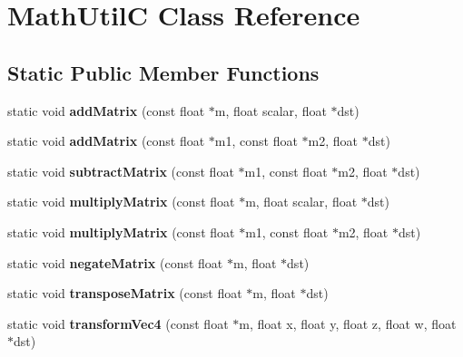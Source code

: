 \hypertarget{classMathUtilC}{}\section{Math\+UtilC Class Reference}
\label{classMathUtilC}
\subsection*{Static Public Member Functions}
\begin{DoxyCompactItemize}
\item 
\mbox{\label{classMathUtilC_a0856156051666babbf2f7dd8cde0551f}} 
static void {\bfseries add\+Matrix} (const float $\ast$m, float scalar, float $\ast$dst)
\item 
\mbox{\label{classMathUtilC_a95674d77169fb3a2ce462707acbefe60}} 
static void {\bfseries add\+Matrix} (const float $\ast$m1, const float $\ast$m2, float $\ast$dst)
\item 
\mbox{\label{classMathUtilC_a8c0aaaef6e85a7f9b46f22c6ac3098f6}} 
static void {\bfseries subtract\+Matrix} (const float $\ast$m1, const float $\ast$m2, float $\ast$dst)
\item 
\mbox{\label{classMathUtilC_a1c5ff036fbc74f8b1580355af79ace12}} 
static void {\bfseries multiply\+Matrix} (const float $\ast$m, float scalar, float $\ast$dst)
\item 
\mbox{\label{classMathUtilC_abf923769df722251d2092841f5d38e74}} 
static void {\bfseries multiply\+Matrix} (const float $\ast$m1, const float $\ast$m2, float $\ast$dst)
\item 
\mbox{\label{classMathUtilC_a9b8a8d00201c64bbe1b770c7a4c8bc25}} 
static void {\bfseries negate\+Matrix} (const float $\ast$m, float $\ast$dst)
\item 
\mbox{\label{classMathUtilC_aa28503b3ce48ba1192f744f640811985}} 
static void {\bfseries transpose\+Matrix} (const float $\ast$m, float $\ast$dst)
\item 
\mbox{\label{classMathUtilC_ae722c13963bdfbf2737e521e49246510}} 
static void {\bfseries transform\+Vec4} (const float $\ast$m, float x, float y, float z, float w, float $\ast$dst)

\end{DoxyCompactItemize}
